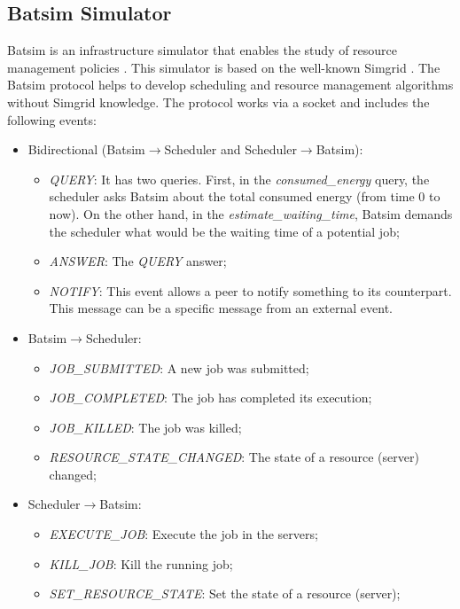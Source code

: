 \subsection{Batsim Simulator}
\label{sec:BATSIM}

Batsim is an infrastructure simulator that enables the study of resource management policies \cite{batsim_jsspp16}. This simulator is based on the well-known Simgrid \cite{casanova2001Simgrid}. The Batsim protocol helps to develop scheduling and resource management algorithms without Simgrid knowledge. The protocol works via a socket and includes the following events:
\begin{itemize}
    \item Bidirectional (Batsim$\rightarrow$Scheduler and Scheduler$\rightarrow$Batsim):
    \begin{itemize}
        \item \textit{QUERY}: It has two queries. First, in the \textit{consumed\_energy} query, the scheduler asks Batsim about the total consumed energy (from time 0 to now). On the other hand, in the \textit{estimate\_waiting\_time}, Batsim demands the scheduler what would be the waiting time of a potential job;
        \item \textit{ANSWER}: The \textit{QUERY} answer;
        \item \textit{NOTIFY}: This event allows a peer to notify something to its counterpart. This message can be a specific message from an external event.
    \end{itemize}
    \item Batsim$\rightarrow$Scheduler:
    \begin{itemize}
        \item \textit{JOB\_SUBMITTED}: A new job was submitted;
        \item \textit{JOB\_COMPLETED}: The job has completed its execution;
        \item \textit{JOB\_KILLED}: The job was killed;
        \item \textit{RESOURCE\_STATE\_CHANGED}: The state of a resource (server) changed;
    \end{itemize}
    \item Scheduler$\rightarrow$Batsim:
    \begin{itemize}
        \item \textit{EXECUTE\_JOB}: Execute the job in the servers;
        \item \textit{KILL\_JOB}: Kill the running job;
        \item \textit{SET\_RESOURCE\_STATE}: Set the state of a resource (server);
    \end{itemize}
\end{itemize}

